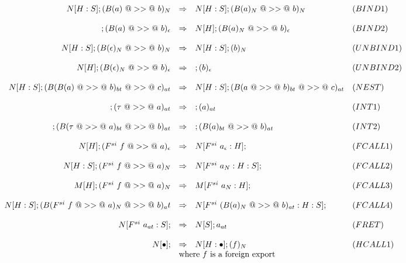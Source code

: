 \documentclass{article}
\newcommand{\hcall}{H}
\newcommand{\fcall}[2]{F^{#1}~#2}
\newcommand{\bound}[1]{B(#1)}
\begin{document}
$$
\begin{array}{rcll}
N[\hcall:S]; (\bound{a}~@>>@~b)_{N} 
        & \Rightarrow 
        & N[\hcall:S]; (\bound{a}_N~@>>@~b)_{N} & (BIND1) \\
\\
; (\bound{a}~@>>@~b)_{\epsilon} 
        & \Rightarrow 
        & N[\hcall]; (\bound{a}_N~@>>@~b)_{\epsilon} & (BIND2) \\
\\
N[\hcall:S]; (\bound{\epsilon}_N~@>>@~b)_N 
        & \Rightarrow 
        & N[\hcall:S]; (b)_N & (UNBIND1) \\
\\
N[\hcall]; (\bound{\epsilon}_N~@>>@~b)_{\epsilon} 
        & \Rightarrow 
        & ; (b)_{\epsilon} & (UNBIND2) \\
\\
N[\hcall:S]; (\bound{\bound{a}~@>>@~b}_{bt}~@>>@~c)_{at} 
        & \Rightarrow 
        & N[\hcall:S]; (\bound{a~@>>@~b}_{bt}~@>>@~c)_{at} & (NEST) \\
\\
; (\tau~@>>@~a)_{at} 
        & \Rightarrow 
        & ; (a)_{at} & (INT1) \\
\\
; (\bound{\tau~@>>@~a}_{bt}~@>>@~b)_{at} 
        & \Rightarrow 
        & ; (\bound{a}_{bt}~@>>@~b)_{at} & (INT2) \\
\\
N[\hcall]; (\fcall{si}{f}~@>>@~a)_{\epsilon} 
        & \Rightarrow 
        & N[\fcall{si}{a_\epsilon}:\hcall];  & (FCALL1) \\
\\
N[\hcall:S]; (\fcall{si}{f}~@>>@~a)_N 
        & \Rightarrow 
        & N[\fcall{si}{a_N}:\hcall:S];  & (FCALL2) \\
\\
M[\hcall]; (\fcall{si}{f}~@>>@~a)_N
        & \Rightarrow 
        & M[\fcall{si}{a_N}:\hcall];  & (FCALL3) \\
\\
N[\hcall:S]; (\bound{\fcall{si}{f}~@>>@~a}_N~@>>@~b)_at
        & \Rightarrow 
        & N[\fcall{si}{(\bound{a}_N~@>>@~b)_{at}}:\hcall:S];  & (FCALL4) \\
\\
N[\fcall{si}{a_{at}}:S];  
        & \Rightarrow 
        & N[S]; a_{at} & (FRET) \\
\\
N[\bullet];
        & \Rightarrow 
        & N[\hcall:\bullet];  (f)_{N} & (HCALL1) \\
        & \multicolumn{2}{l}{\mbox{where $f$ is a foreign export}} \\

\end{array}$$
\end{document}
